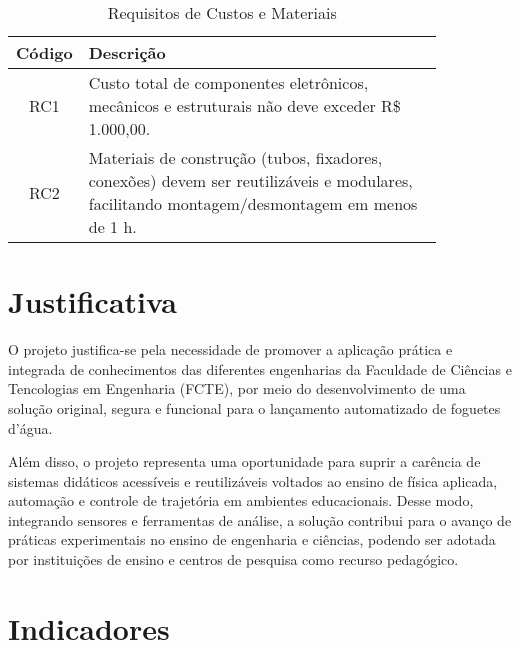 \begin{samepage}
\begin{table}[htpb]
\centering
\scriptsize
\setlength{\tabcolsep}{4pt}
\caption{Requisitos de Custos e Materiais}
\begin{tabular}{|c|p{0.85\linewidth}|}
\hline
\textbf{Código} & \textbf{Descrição} \\
\hline
RC1 & Custo total de componentes eletrônicos, mecânicos e estruturais não deve exceder R\$ 1.000,00. \\
\hline
RC2 & Materiais de construção (tubos, fixadores, conexões) devem ser reutilizáveis e modulares, facilitando montagem/desmontagem em menos de 1 h. \\
\hline
\end{tabular}
\label{tab:requisitos-custos}
\end{table}
\end{samepage}

\section{Justificativa}

O projeto justifica-se pela necessidade de promover a aplicação prática e integrada de conhecimentos das diferentes engenharias da Faculdade de Ciências e Tencologias em Engenharia (FCTE), por meio do desenvolvimento de uma solução original, segura e funcional para o lançamento automatizado de foguetes d’água. 

Além disso, o projeto representa uma oportunidade para suprir a carência de sistemas didáticos acessíveis e reutilizáveis voltados ao ensino de física aplicada, automação e controle de trajetória em ambientes educacionais. Desse modo, integrando sensores e ferramentas de análise, a solução contribui para o avanço de práticas experimentais no ensino de engenharia e ciências, podendo ser adotada por instituições de ensino e centros de pesquisa como recurso pedagógico. 



\section{Indicadores}

